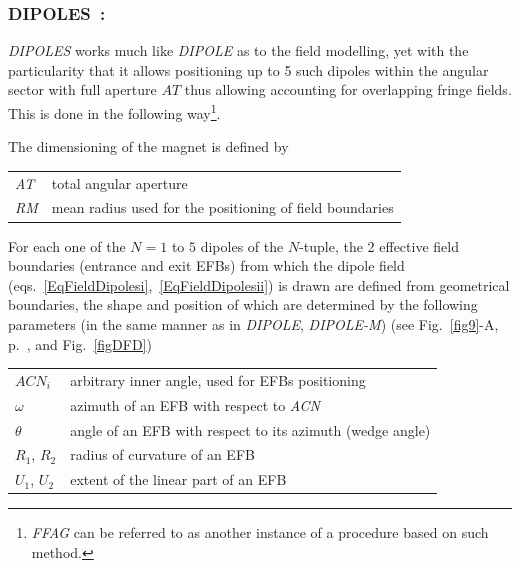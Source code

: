 {\newpage

\subsubsection*{DIPOLES~: \DIPOLESTitl~\cite{reportNIMFFAG,reportICFAFFAG}} \label{DIPOLES} 
\medskip

\noindent \textsl{DIPOLES} works much like \textsl{DIPOLE} 
as to the field modelling, yet with the particularity that it allows positioning up to 5 such 
dipoles within the angular sector with full aperture $AT$ thus allowing 
accounting for overlapping fringe fields. 
This is done in the following 
way\footnote{\textsl{FFAG} can be referred to as another instance of a procedure based on such method.}. 

\bigskip

\noindent  The dimensioning of the magnet is defined by

\bigskip

 \begin{tabular}{>{\sl}l!{~:}l}
	 AT &  total angular aperture \\
	 RM & mean radius used for the positioning of field boundaries\\
 \end{tabular}

\bigskip

\noindent For each one of the $N=1$ to $5$ dipoles of the  $N$-tuple, 
the 2 effective field boundaries (entrance and exit EFBs) from which  the dipole field  
 (eqs.~\ref{EqFieldDipolesi},~\ref{EqFieldDipolesii})  is drawn are
defined from geometrical  boundaries, the shape and position of which are determined by the 
following parameters (in the same manner as in \textsl{DIPOLE}, \textsl{DIPOLE-M})
 (see Fig.~\ref{fig9}-A, p.~\pageref{fig9}, and Fig.~\ref{figDFD}) 

\bigskip

\begin{tabular}{l!{~:}l}
	$ACN_i$  & arbitrary inner angle, used for EFBs positioning  \\
	$\omega$ &  azimuth of an EFB with respect to  \textsl{ACN}\\
	$\theta$ & angle of an EFB with respect to its azimuth (wedge angle)\\ 
	$R_1$, $R_2$  &  radius of curvature of an EFB\\
	$U_1$, $U_2$  &  extent of the linear part of an EFB  \\
\end{tabular}

}
